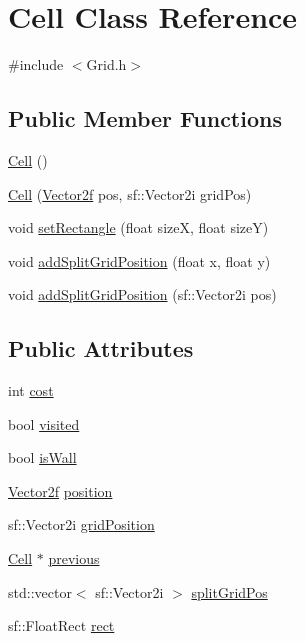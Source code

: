 \hypertarget{class_cell}{}\section{Cell Class Reference}
\label{class_cell}


{\ttfamily \#include $<$Grid.\+h$>$}

\subsection*{Public Member Functions}
\begin{DoxyCompactItemize}
\item 
\mbox{\hyperlink{class_cell_a394510643e8664cf12b5efaf5cb99f71}{Cell}} ()
\item 
\mbox{\hyperlink{class_cell_a593b00540f83a9e43da779ca17e9a3f5}{Cell}} (\mbox{\hyperlink{class_vector2f}{Vector2f}} pos, sf\+::\+Vector2i grid\+Pos)
\item 
void \mbox{\hyperlink{class_cell_a22a3a73581af175918b3601ee1bf40f2}{set\+Rectangle}} (float sizeX, float sizeY)
\item 
void \mbox{\hyperlink{class_cell_a7a6b856714dcd60e3f819217c74c7b30}{add\+Split\+Grid\+Position}} (float x, float y)
\item 
void \mbox{\hyperlink{class_cell_aa60de37dfe4cadffa660e8239e68546d}{add\+Split\+Grid\+Position}} (sf\+::\+Vector2i pos)
\end{DoxyCompactItemize}
\subsection*{Public Attributes}
\begin{DoxyCompactItemize}
\item 
int \mbox{\hyperlink{class_cell_a49a494187bbad4415fef8f29e770072b}{cost}}
\item 
bool \mbox{\hyperlink{class_cell_ac0fdf52adc7d9dd8c5de95635ff04de3}{visited}}
\item 
bool \mbox{\hyperlink{class_cell_a18a31874213ac8e564a7275cc9513de3}{is\+Wall}}
\item 
\mbox{\hyperlink{class_vector2f}{Vector2f}} \mbox{\hyperlink{class_cell_acdc3c3503837eb58baed27f15e29127c}{position}}
\item 
sf\+::\+Vector2i \mbox{\hyperlink{class_cell_a3553994227bdd472919b976635954a28}{grid\+Position}}
\item 
\mbox{\hyperlink{class_cell}{Cell}} $\ast$ \mbox{\hyperlink{class_cell_aa2848f5811bdd74d823ec181e81b96cf}{previous}}
\item 
std\+::vector$<$ sf\+::\+Vector2i $>$ \mbox{\hyperlink{class_cell_aa84384a1a569adb1f7391786ec2c71e7}{split\+Grid\+Pos}}
\item 
sf\+::\+Float\+Rect \mbox{\hyperlink{class_cell_a9caa7beb50cd41653973716195a28061}{rect}}
\end{DoxyCompactItemize}


